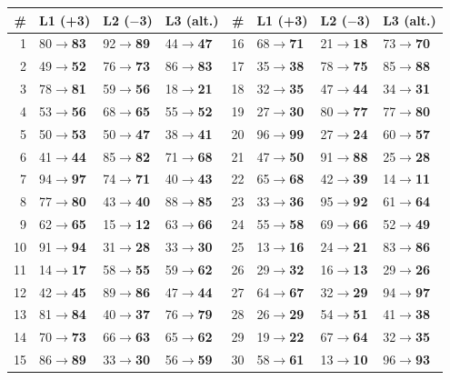 \documentclass[10pt,a4paper]{article}
\begin{document}
{\small\begin{tabular}{@{}rlll@{\hspace{1.2cm}}rlll@{}}\toprule \# & L1 (+3) & L2 ($-$3) & L3 (alt.) & \# & L1 (+3) & L2 ($-$3) & L3 (alt.)\\ \midrule
1 & 80$\to$\textbf{83} & 92$\to$\textbf{89} & 44$\to$\textbf{47} & 16 & 68$\to$\textbf{71} & 21$\to$\textbf{18} & 73$\to$\textbf{70}\\
2 & 49$\to$\textbf{52} & 76$\to$\textbf{73} & 86$\to$\textbf{83} & 17 & 35$\to$\textbf{38} & 78$\to$\textbf{75} & 85$\to$\textbf{88}\\
3 & 78$\to$\textbf{81} & 59$\to$\textbf{56} & 18$\to$\textbf{21} & 18 & 32$\to$\textbf{35} & 47$\to$\textbf{44} & 34$\to$\textbf{31}\\
4 & 53$\to$\textbf{56} & 68$\to$\textbf{65} & 55$\to$\textbf{52} & 19 & 27$\to$\textbf{30} & 80$\to$\textbf{77} & 77$\to$\textbf{80}\\
5 & 50$\to$\textbf{53} & 50$\to$\textbf{47} & 38$\to$\textbf{41} & 20 & 96$\to$\textbf{99} & 27$\to$\textbf{24} & 60$\to$\textbf{57}\\
6 & 41$\to$\textbf{44} & 85$\to$\textbf{82} & 71$\to$\textbf{68} & 21 & 47$\to$\textbf{50} & 91$\to$\textbf{88} & 25$\to$\textbf{28}\\
7 & 94$\to$\textbf{97} & 74$\to$\textbf{71} & 40$\to$\textbf{43} & 22 & 65$\to$\textbf{68} & 42$\to$\textbf{39} & 14$\to$\textbf{11}\\
8 & 77$\to$\textbf{80} & 43$\to$\textbf{40} & 88$\to$\textbf{85} & 23 & 33$\to$\textbf{36} & 95$\to$\textbf{92} & 61$\to$\textbf{64}\\
9 & 62$\to$\textbf{65} & 15$\to$\textbf{12} & 63$\to$\textbf{66} & 24 & 55$\to$\textbf{58} & 69$\to$\textbf{66} & 52$\to$\textbf{49}\\
10 & 91$\to$\textbf{94} & 31$\to$\textbf{28} & 33$\to$\textbf{30} & 25 & 13$\to$\textbf{16} & 24$\to$\textbf{21} & 83$\to$\textbf{86}\\
11 & 14$\to$\textbf{17} & 58$\to$\textbf{55} & 59$\to$\textbf{62} & 26 & 29$\to$\textbf{32} & 16$\to$\textbf{13} & 29$\to$\textbf{26}\\
12 & 42$\to$\textbf{45} & 89$\to$\textbf{86} & 47$\to$\textbf{44} & 27 & 64$\to$\textbf{67} & 32$\to$\textbf{29} & 94$\to$\textbf{97}\\
13 & 81$\to$\textbf{84} & 40$\to$\textbf{37} & 76$\to$\textbf{79} & 28 & 26$\to$\textbf{29} & 54$\to$\textbf{51} & 41$\to$\textbf{38}\\
14 & 70$\to$\textbf{73} & 66$\to$\textbf{63} & 65$\to$\textbf{62} & 29 & 19$\to$\textbf{22} & 67$\to$\textbf{64} & 32$\to$\textbf{35}\\
15 & 86$\to$\textbf{89} & 33$\to$\textbf{30} & 56$\to$\textbf{59} & 30 & 58$\to$\textbf{61} & 13$\to$\textbf{10} & 96$\to$\textbf{93}\\
\bottomrule\end{tabular}}\par\medskip
\end{document}

